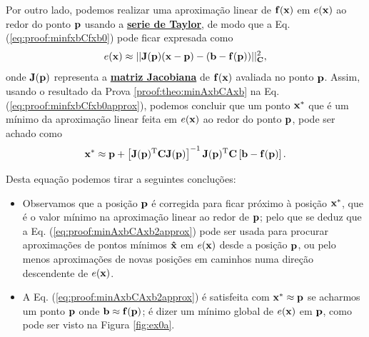 \begin{myproofT}
Por outro lado, podemos realizar uma aproximação linear de $\VECTOR{f}(\VECTOR{x})$ em $e(\VECTOR{x})$
ao redor do ponto $\VECTOR{p}$ usando a \hyperref[def:taylor]{\textbf{serie de Taylor}},
de modo que a Eq. (\ref{eq:proof:minfxbCfxb0}) pode ficar expresada como
\begin{equation}\label{eq:proof:minfxbCfxb0approx}
e(\VECTOR{x}) \approx ||\MATRIX{J}(\VECTOR{p})(\VECTOR{x}-\VECTOR{p})-(\VECTOR{b}-\VECTOR{f}(\VECTOR{p}))||_{\MATRIX{C}}^2,
\end{equation}
onde $\MATRIX{J}(\VECTOR{p})$ representa a \hyperref[def:jacobian]{\textbf{matriz Jacobiana}} 
de $\VECTOR{f}(\VECTOR{x})$ avaliada no ponto $\VECTOR{p}$.
Assim, usando o resultado da Prova \ref{proof:theo:minAxbCAxb} na Eq. (\ref{eq:proof:minfxbCfxb0approx}), 
podemos concluir que um ponto $\VECTOR{x}^*$ que é 
um mínimo da aproximação linear feita em $e(\VECTOR{x})$ ao redor do ponto $\VECTOR{p}$,
pode ser achado como
\begin{equation}\label{eq:proof:minAxbCAxb2approx}
\VECTOR{x}^* \approx \VECTOR{p}+ \left[ \MATRIX{J}(\VECTOR{p})^{\transpose}\MATRIX{C}\MATRIX{J}(\VECTOR{p}) \right]^{-1} \MATRIX{J}(\VECTOR{p})^{\transpose}\MATRIX{C} \left[\VECTOR{b}-\VECTOR{f}(\VECTOR{p})\right].
\end{equation}


Desta equação podemos tirar a seguintes concluções:
\begin{itemize}

\item Observamos que a posição $\VECTOR{p}$ é corregida para ficar próximo à posição $\VECTOR{x}^*$, 
que é o valor mínimo na aproximação linear ao redor de $\VECTOR{p}$;
pelo que se deduz que a Eq. (\ref{eq:proof:minAxbCAxb2approx})
pode ser usada para procurar aproximações de pontos mínimos $\VECTOR{\hat{x}}$ em $e(\VECTOR{x})$ desde a posição $\VECTOR{p}$,
ou pelo menos aproximações de novas posições em caminhos numa direção descendente de $e(\VECTOR{x})$.

\item A Eq. (\ref{eq:proof:minAxbCAxb2approx}) é satisfeita 
com $\VECTOR{x}^* \approx \VECTOR{p}$ se acharmos um  
ponto $\VECTOR{p}$ onde  $\VECTOR{b} \approx \VECTOR{f}(\VECTOR{p})$; 
é dizer um mínimo global de $e(\VECTOR{x})$ em $\VECTOR{p}$, como pode ser visto na Figura \ref{fig:ex0a}. 


\end{itemize}
\end{myproofT}
